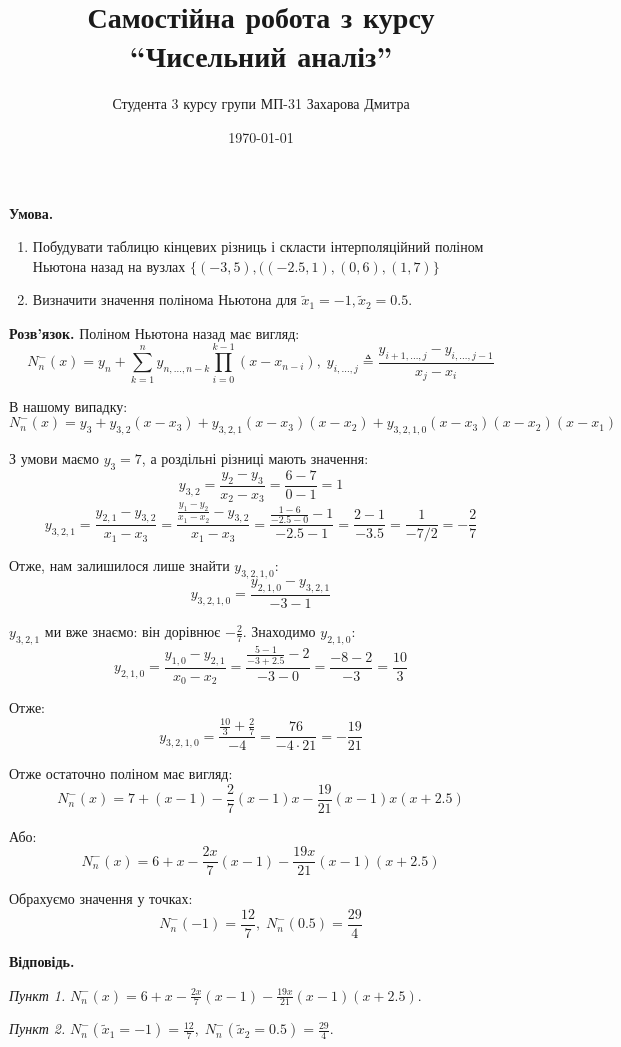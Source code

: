 \documentclass[12pt]{extarticle}
\title{Самостійна робота з курсу ``Чисельний аналіз''}
\author{Студента 3 курсу групи МП-31 Захарова Дмитра}
\date{\today}
\begin{document}
\maketitle

\textbf{Умова.} 
\begin{enumerate}
    \item Побудувати таблицю кінцевих різниць і скласти інтерполяційний поліном Ньютона назад на вузлах $\{(-3,5),((-2.5,1),(0,6),(1,7)\}$
    \item Визначити значення полінома Ньютона для $\widetilde{x}_1 = -1, \widetilde{x}_2 = 0.5$.
\end{enumerate}

\textbf{Розв'язок.} Поліном Ньютона назад має вигляд:
\[
N_n^-(x) = y_n + \sum_{k=1}^n y_{n,\dots,n-k}\prod_{i=0}^{k-1}(x-x_{n-i}), \; y_{i,\dots,j} \triangleq \frac{y_{i+1,\dots,j}-y_{i,\dots,j-1}}{x_j-x_i}
\]

В нашому випадку:
\[
N_n^{-}(x) = y_3 + y_{3,2}(x-x_3) + y_{3,2,1}(x-x_3)(x-x_2) + y_{3,2,1,0}(x-x_3)(x-x_2)(x-x_1) 
\]

З умови маємо $y_3=7$, а роздільні різниці мають значення: 
\[
y_{3,2} = \frac{y_2-y_3}{x_2-x_3} = \frac{6-7}{0-1} = 1
\]
\[
y_{3,2,1} = \frac{y_{2,1} - y_{3,2}}{x_1 - x_3} = \frac{\frac{y_1-y_2}{x_1-x_2}-y_{3,2}}{x_1-x_3} = \frac{\frac{1-6}{-2.5-0}-1}{-2.5-1} = \frac{2-1}{-3.5} = \frac{1}{-7/2} = -\frac{2}{7}
\]

Отже, нам залишилося лише знайти $y_{3,2,1,0}$:
\[
y_{3,2,1,0} = \frac{y_{2,1,0}-y_{3,2,1}}{-3-1}
\]

$y_{3,2,1}$ ми вже знаємо: він дорівнює $-\frac{2}{7}$. Знаходимо $y_{2,1,0}$:
\[
y_{2,1,0} = \frac{y_{1,0}-y_{2,1}}{x_0-x_2} = \frac{\frac{5-1}{-3+2.5} - 2}{-3-0} = \frac{-8-2}{-3} = \frac{10}{3}
\]

Отже:
\[
y_{3,2,1,0} = \frac{\frac{10}{3}+\frac{2}{7}}{-4} = \frac{76}{-4 \cdot 21} = -\frac{19}{21}
\]

Отже остаточно поліном має вигляд:
\[
N_n^{-}(x) = 7 + (x-1) - \frac{2}{7}(x-1)x - \frac{19}{21}(x-1)x(x+2.5)
\]

Або:
\[
N_n^{-}(x) = 6+x - \frac{2x}{7}(x-1) - \frac{19x}{21}(x-1)(x+2.5)
\]

Обрахуємо значення у точках:
\[
N_n^{-}(-1) = \frac{12}{7}, \; N_n^-(0.5) = \frac{29}{4}
\]

\textbf{Відповідь.} 

\textit{Пункт 1.} $N_n^-(x) = 6+x - \frac{2x}{7}(x-1) - \frac{19x}{21}(x-1)(x+2.5)$.

\textit{Пункт 2.} $N_n^{-}(\widetilde{x}_1=-1)=\frac{12}{7}, \; N_n^-(\widetilde{x}_2=0.5)=\frac{29}{4}$.
\end{document}
